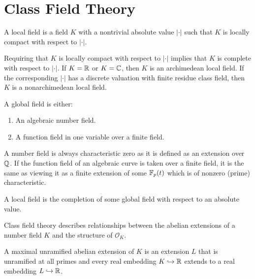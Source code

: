 \setchapterpreamble[u]{\margintoc}
\chapter{Class Field Theory}


\begin{definition}
    A local field is a field $K$ with a nontrivial absolute value $|\cdot|$ such that $K$ is locally compact with respect to $|\cdot|$.
\end{definition}

Requiring that $K$ is locally compact with respect to $|\cdot|$ implies that $K$ is complete with respect to $|\cdot|$. If $K = \mathbb{R}$ or $K = \mathbb{C}$, then $K$ is an archimedean local field. If the corresponding $|\cdot|$ has a discrete valuation with finite residue class field, then $K$ is a nonarchimedean local field.

\begin{definition}
    A global field is either:

    \begin{enumerate}[(1)]
        \item An algebraic number field.
        \item A function field in one variable over a finite field.
    \end{enumerate}
\end{definition}

A number field is always characteristic zero as it is defined as an extension over $\mathbb{Q}$. If the function field of an algebraic curve is taken over a finite field, it is the same as viewing it as a finite extension of some $\mathbb{F}_p(t)$ which is of nonzero (prime) characteristic.

\begin{proposition}
    A local field is the completion of some global field with respect to an absolute value.
\end{proposition}

Class field theory describes relationships between the abelian extensions of a number field $K$ and the structure of $\mathcal{O}_{K}$.

\begin{definition}
    A maximal unramified abelian extension of $K$ is an extension $L$ that is unramified at all primes and every real embedding $K \hookrightarrow \mathbb{R}$ extends to a real embedding $L \hookrightarrow \mathbb{R}$.
\end{definition}

